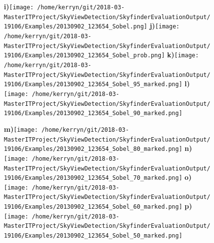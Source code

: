\documentclass{article}
\begin{document}
\begin{figure}
\textbf{\scriptsize{i)}}\texttt{[image: /home/kerryn/git/2018-03-MasterITProject/SkyViewDetection/SkyfinderEvaluationOutput/19106/Examples/20130902\_123654\_Sobel.png]} \hfill%
\textbf{\scriptsize{j)}}\texttt{[image: /home/kerryn/git/2018-03-MasterITProject/SkyViewDetection/SkyfinderEvaluationOutput/19106/Examples/20130902\_123654\_Sobel\_prob.png]} \hfill%
\textbf{\scriptsize{k)}}\texttt{[image: /home/kerryn/git/2018-03-MasterITProject/SkyViewDetection/SkyfinderEvaluationOutput/19106/Examples/20130902\_123654\_Sobel\_95\_marked.png]} \hfill%
\textbf{\scriptsize{l)}}\texttt{[image: /home/kerryn/git/2018-03-MasterITProject/SkyViewDetection/SkyfinderEvaluationOutput/19106/Examples/20130902\_123654\_Sobel\_90\_marked.png]} 

\textbf{\scriptsize{m)}}\texttt{[image: /home/kerryn/git/2018-03-MasterITProject/SkyViewDetection/SkyfinderEvaluationOutput/19106/Examples/20130902\_123654\_Sobel\_80\_marked.png]} \hfill%
\textbf{\scriptsize{n)}}\texttt{[image: /home/kerryn/git/2018-03-MasterITProject/SkyViewDetection/SkyfinderEvaluationOutput/19106/Examples/20130902\_123654\_Sobel\_70\_marked.png]} \hfill%
\textbf{\scriptsize{o)}}\texttt{[image: /home/kerryn/git/2018-03-MasterITProject/SkyViewDetection/SkyfinderEvaluationOutput/19106/Examples/20130902\_123654\_Sobel\_60\_marked.png]} \hfill%
\textbf{\scriptsize{p)}}\texttt{[image: /home/kerryn/git/2018-03-MasterITProject/SkyViewDetection/SkyfinderEvaluationOutput/19106/Examples/20130902\_123654\_Sobel\_50\_marked.png]} 

\end{figure} 

\clearpage %
\end{document}
